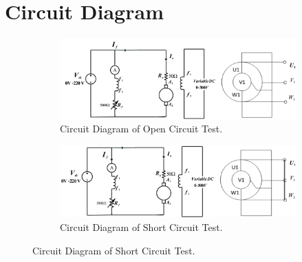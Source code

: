 \documentclass[a4paper,12pt]{article}
\begin{document}
	\section{Circuit Diagram}
\begin{figure}[H]
	\centering
	\begin{subfigure}[t]{.9\textwidth}
		\centering
		\includegraphics[width=1\textwidth]{Images/eee3108exp002}
		\caption{Circuit Diagram of Open Circuit Test.}
		
	\end{subfigure}
	\begin{subfigure}[t]{.9\textwidth}
		\centering
		\includegraphics[width=1\textwidth]{Images/eee3108exp003}
		\caption{Circuit Diagram of Short Circuit Test.}
		
	\end{subfigure}
	
	
\end{figure}
\end{document}
